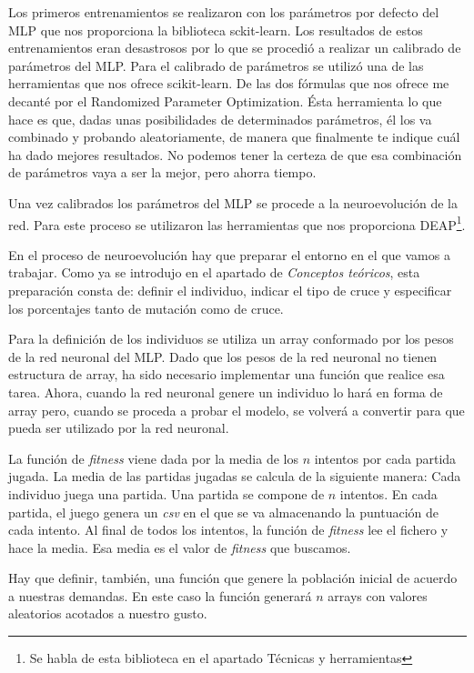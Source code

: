 Los primeros entrenamientos se realizaron con los parámetros por defecto del MLP que nos proporciona la biblioteca sckit-learn. Los resultados de estos entrenamientos eran desastrosos por lo que se procedió a realizar un calibrado de parámetros del MLP. Para el calibrado de parámetros se utilizó una de las herramientas que nos ofrece scikit-learn. De las dos fórmulas que nos ofrece me decanté por el Randomized Parameter Optimization. Ésta herramienta lo que hace es que, dadas unas posibilidades de determinados parámetros, él los va combinado y probando aleatoriamente, de manera que finalmente te indique cuál ha dado mejores resultados. No podemos tener la certeza de que esa combinación de parámetros vaya a ser la mejor, pero ahorra tiempo.

Una vez calibrados los parámetros del MLP se procede a la neuroevolución de la red. Para este proceso se utilizaron las herramientas que nos proporciona DEAP\footnote{Se habla de esta biblioteca en el apartado Técnicas y herramientas}. 


En el proceso de neuroevolución hay que preparar el entorno en el que vamos a trabajar. Como ya se introdujo en el apartado de \emph{Conceptos teóricos}, esta preparación consta de: definir el individuo, indicar el tipo de cruce y especificar los porcentajes tanto de mutación como de cruce.

Para la definición de los individuos se utiliza un array conformado por los pesos de la red neuronal del MLP. Dado que los pesos de la red neuronal no tienen estructura de array, ha sido necesario implementar una función que realice esa tarea. Ahora, cuando la red neuronal genere un individuo lo hará en forma de array pero, cuando se proceda a probar el modelo, se volverá a convertir para que pueda ser utilizado por la red neuronal.

La función de \emph{fitness} viene dada por la media de los $n$ intentos por cada partida jugada. La media de las partidas jugadas se calcula de la siguiente manera: Cada individuo juega una partida. Una partida se compone de $n$ intentos. En cada partida, el juego genera un \emph{csv} en el que se va almacenando la puntuación de cada intento. Al final de todos los intentos, la función de \emph{fitness} lee el fichero y hace la media. Esa media es el valor de \emph{fitness} que buscamos.


Hay que definir, también, una función que genere la población inicial de acuerdo a nuestras demandas. En este caso la función generará $n$ arrays con valores aleatorios acotados a nuestro gusto.


